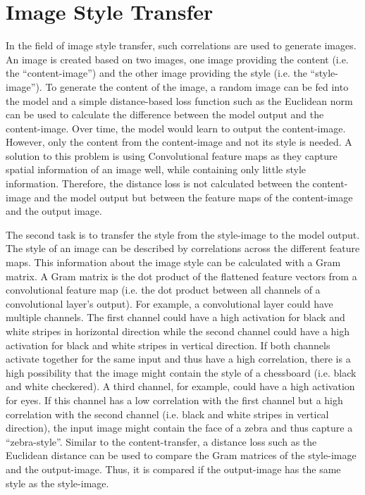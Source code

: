 \chapter{Image Style Transfer}
In the field of image style transfer, such correlations are used to generate images.
An image is created based on two images, one image providing the content (i.e. the ``content-image'') and the other image providing the style (i.e. the ``style-image'').
To generate the content of the image, a random image can be fed into the model and a simple distance-based loss function such as the Euclidean norm can be used to calculate the difference between the model output and the content-image.
Over time, the model would learn to output the content-image.
However, only the content from the content-image and not its style is needed.
A solution to this problem is using Convolutional feature maps as they capture spatial information of an image well, while containing only little style information.
Therefore, the distance loss is not calculated between the content-image and the model output but between the feature maps of the content-image and the output image.

The second task is to transfer the style from the style-image to the model output.
The style of an image can be described by correlations across the different feature maps.
This information about the image style can be calculated with a Gram matrix.
A Gram matrix is the dot product of the flattened feature vectors from a convolutional feature map (i.e. the dot product between all channels of a convolutional layer's output).
For example, a convolutional layer could have multiple channels. The first channel could have a high activation for black and white stripes in horizontal direction while the second channel could have a high activation for black and white stripes in vertical direction. If both channels activate together for the same input and thus have a high correlation, there is a high possibility that the image might contain the style of a chessboard (i.e. black and white checkered). A third channel, for example, could have a high activation for eyes. If this channel has a low correlation with the first channel but a high correlation with the second channel (i.e. black and white stripes in vertical direction), the input image might contain the face of a zebra and thus capture a ``zebra-style''.
Similar to the content-transfer, a distance loss such as the Euclidean distance can be used to compare the Gram matrices of the style-image and the output-image.
Thus, it is compared if the output-image has the same style as the style-image.

